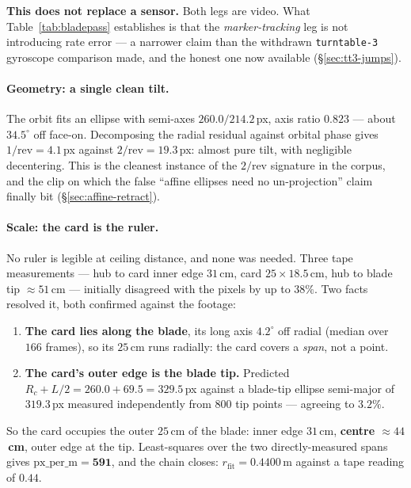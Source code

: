 \documentclass[11pt,a4paper]{article}
\begin{document}
\textbf{This does not replace a sensor.} Both legs are video. What Table~\ref{tab:bladepass}
establishes is that the \emph{marker-tracking} leg is not introducing rate error --- a narrower
claim than the withdrawn \texttt{turntable-3} gyroscope comparison made, and the honest one now
available (\S\ref{sec:tt3-jumps}).

\paragraph{Geometry: a single clean tilt.} The orbit fits an ellipse with semi-axes
$260.0/214.2$\,px, axis ratio $\mathbf{0.823}$ --- about $34.5^\circ$ off face-on. Decomposing the
radial residual against orbital phase gives $1/\mathrm{rev} = 4.1$\,px against $2/\mathrm{rev} =
19.3$\,px: almost pure tilt, with negligible decentering. This is the cleanest instance of the
$2/\mathrm{rev}$ signature in the corpus, and the clip on which the false ``affine ellipses need
no un-projection'' claim finally bit (\S\ref{sec:affine-retract}).

\paragraph{Scale: the card is the ruler.} No ruler is legible at ceiling distance, and none was
needed. Three tape measurements --- hub to card inner edge $31$\,cm, card $25\times18.5$\,cm, hub
to blade tip ${\approx}51$\,cm --- initially disagreed with the pixels by up to $38\%$. Two facts
resolved it, both confirmed against the footage:

\begin{enumerate}
  \item \textbf{The card lies along the blade}, its long axis $4.2^\circ$ off radial (median over
  $166$ frames), so its $25$\,cm runs radially: the card covers a \emph{span}, not a point.
  \item \textbf{The card's outer edge is the blade tip.} Predicted $R_c + L/2 = 260.0 + 69.5 =
  329.5$\,px against a blade-tip ellipse semi-major of $319.3$\,px measured independently from
  $800$ tip points --- agreeing to $3.2\%$.
\end{enumerate}

So the card occupies the outer $25$\,cm of the blade: inner edge $31$\,cm, \textbf{centre
${\approx}44$\,cm}, outer edge at the tip. Least-squares over the two directly-measured spans
gives $\mathrm{px\_per\_m} = \mathbf{591}$, and the chain closes: $r_{\mathrm{fit}} = 0.4400$\,m
against a tape reading of $0.44$.
\end{document}
